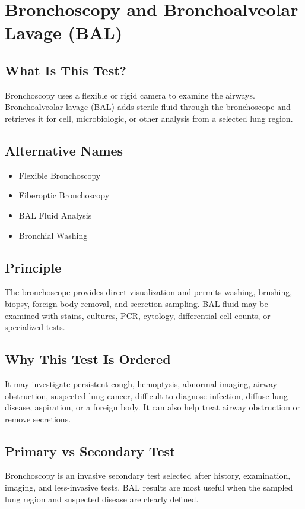 \chapter{Bronchoscopy and Bronchoalveolar Lavage (BAL)}

\section*{What Is This Test?}
Bronchoscopy uses a flexible or rigid camera to examine the airways. Bronchoalveolar lavage (BAL) adds sterile fluid through the bronchoscope and retrieves it for cell, microbiologic, or other analysis from a selected lung region.

\section*{Alternative Names}
\begin{itemize}
  \item Flexible Bronchoscopy
  \item Fiberoptic Bronchoscopy
  \item BAL Fluid Analysis
  \item Bronchial Washing
\end{itemize}

\section*{Principle}
The bronchoscope provides direct visualization and permits washing, brushing, biopsy, foreign-body removal, and secretion sampling. BAL fluid may be examined with stains, cultures, PCR, cytology, differential cell counts, or specialized tests.

\section*{Why This Test Is Ordered}
It may investigate persistent cough, hemoptysis, abnormal imaging, airway obstruction, suspected lung cancer, difficult-to-diagnose infection, diffuse lung disease, aspiration, or a foreign body. It can also help treat airway obstruction or remove secretions.

\section*{Primary vs Secondary Test}
Bronchoscopy is an invasive secondary test selected after history, examination, imaging, and less-invasive tests. BAL results are most useful when the sampled lung region and suspected disease are clearly defined.

